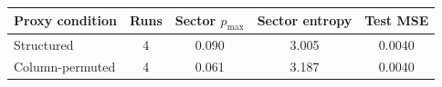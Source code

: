 \begin{tabular}{lcccc}
\toprule
Proxy condition & Runs & Sector $p_{\max}$ & Sector entropy & Test MSE \\
\midrule
Structured & 4 & 0.090 & 3.005 & 0.0040 \\
Column-permuted & 4 & 0.061 & 3.187 & 0.0040 \\
\bottomrule
\end{tabular}
